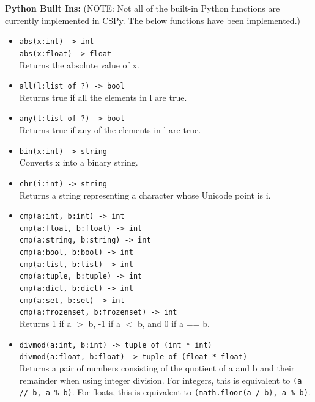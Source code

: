 \documentclass{article}
\begin{document}
\textbf{Python Built Ins:}
(NOTE: Not all of the built-in Python functions are currently implemented in CSPy. The below functions have been implemented.)
\begin{itemize}
\item \verb|abs(x:int) -> int| \\
      \verb|abs(x:float) -> float| \\
  Returns the absolute value of x.

\item \verb|all(l:list of ?) -> bool| \\
  Returns true if all the elements in l are true.

\item \verb|any(l:list of ?) -> bool| \\
  Returns true if any of the elements in l are true. 

\item \verb|bin(x:int) -> string| \\
 Converts x into a binary string. 

\item \verb|chr(i:int) -> string| \\
   Returns a string representing a character whose Unicode point is i.

\item \verb|cmp(a:int, b:int) -> int| \\
\verb|cmp(a:float, b:float) -> int| \\
\verb|cmp(a:string, b:string) -> int| \\
\verb|cmp(a:bool, b:bool) -> int| \\
\verb|cmp(a:list, b:list) -> int| \\
\verb|cmp(a:tuple, b:tuple) -> int| \\
\verb|cmp(a:dict, b:dict) -> int| \\
\verb|cmp(a:set, b:set) -> int| \\
\verb|cmp(a:frozenset, b:frozenset) -> int| \\
Returns 1 if a $>$ b, -1 if a $<$ b, and 0 if a == b. 

\item \verb|divmod(a:int, b:int) -> tuple of (int * int)| \\
 \verb|divmod(a:float, b:float) -> tuple of (float * float)| \\
Returns a pair of numbers consisting of the quotient of a and b and their remainder when using integer division. For integers, this is equivalent to \verb|(a // b, a % b)|. For floats, this is equivalent to \verb|(math.floor(a / b), a % b)|. 


\end{itemize}
\end{document}
